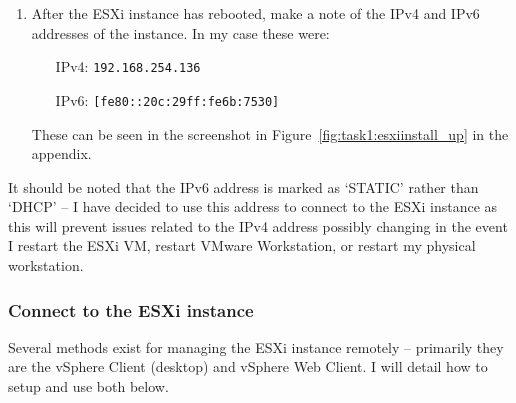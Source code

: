 \begin{enumerate}[resume*=task1methodology]
\begin{enumerate}[label=(\alph*)]
      \item After the ESXi instance has rebooted, make a note of the IPv4 and IPv6 addresses of the instance. In my case these were:
      \begin{itemize}[leftmargin=1.5cm]
        \item [IPv4:] \texttt{192.168.254.136}
        \item [IPv6:] \texttt{[fe80::20c:29ff:fe6b:7530]}
      \end{itemize}
      These can be seen in the screenshot in Figure~\ref{fig:task1:esxiinstall_up} in the  appendix.
    \end{enumerate}
\end{enumerate}

\noindent It should be noted that the IPv6 address is marked as `STATIC' rather than `DHCP' -- I have decided to use this address to connect to the ESXi instance as this will prevent issues related to the IPv4 address possibly changing in the event I restart the ESXi VM, restart VMware Workstation, or restart my physical workstation.

\subsubsection{Connect to the ESXi instance}
Several methods exist for managing the ESXi instance remotely -- primarily they are the vSphere Client (desktop) and vSphere Web Client. I will detail how to setup and use both below.

